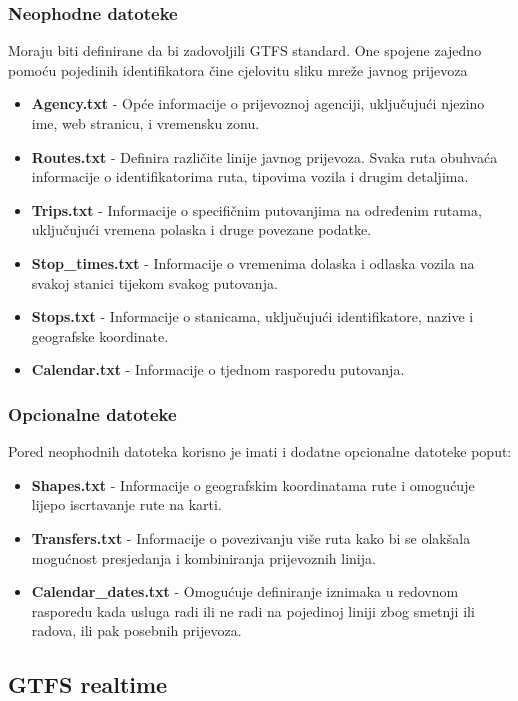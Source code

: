 \documentclass[zavrsnirad]{fer}
\begin{document}
\subsubsection{Neophodne datoteke}
Moraju biti definirane da bi zadovoljili GTFS standard. One spojene zajedno pomoću pojedinih identifikatora čine cjelovitu sliku mreže javnog prijevoza
\begin{itemize}
	\item \textbf{Agency.txt} -
	Opće informacije o prijevoznoj agenciji, uključujući njezino ime, web stranicu, i vremensku zonu.
	\item \textbf{Routes.txt} -
	Definira različite linije javnog prijevoza. Svaka ruta obuhvaća informacije o identifikatorima ruta, tipovima vozila i drugim detaljima.
	\item \textbf{Trips.txt} -
	Informacije o specifičnim putovanjima na određenim rutama, uključujući vremena polaska i druge povezane podatke.
	\item \textbf{Stop\_times.txt} -
	Informacije o vremenima dolaska i odlaska vozila na svakoj stanici tijekom svakog putovanja.
	\item \textbf{Stops.txt} -
	Informacije o stanicama, uključujući identifikatore, nazive i geografske koordinate.
	\item \textbf{Calendar.txt} -
	Informacije o tjednom rasporedu putovanja.
\end{itemize}

\subsubsection{Opcionalne datoteke}
Pored neophodnih datoteka korisno je imati i dodatne opcionalne datoteke poput:
\begin{itemize}
	\item \textbf{Shapes.txt} -
	Informacije o geografskim koordinatama rute i omogućuje lijepo iscrtavanje rute na karti.
	\item \textbf{Transfers.txt} -
	Informacije o povezivanju više ruta kako bi se olakšala mogućnost presjedanja i kombiniranja prijevoznih linija.
	\item \textbf{Calendar\_dates.txt} -
	Omogućuje definiranje iznimaka u redovnom rasporedu kada usluga radi ili ne radi na pojedinoj liniji zbog smetnji ili radova, ili pak posebnih prijevoza.
\end{itemize}

\subsection[GTFS-rt]{GTFS realtime}
\end{document}
